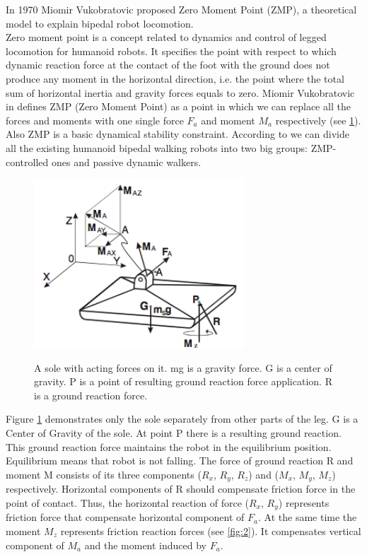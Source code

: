 \documentclass[12pt,a4paper]{report}
\begin{document}
		In 1970 Miomir Vukobratovic proposed Zero Moment Point (ZMP), a theoretical model to explain bipedal robot locomotion.\\
		Zero moment point is a concept related to dynamics and control of legged locomotion for humanoid robots. It specifies the point with respect to which dynamic reaction force at the contact of the foot with the ground does not produce any moment in the horizontal direction, i.e. the point where the total sum of horizontal inertia and gravity forces equals to zero.
		Miomir Vukobratovic in \cite{vukobratovic2004zero} defines ZMP (Zero Moment Point) as a point in which we can replace all the forces and moments with one single force $F_a$ and moment $M_a$ respectively  (see \cref{fig:1}). Also ZMP is a basic dynamical stability constraint.	According to \cite{manchester2011stable} we can divide all the existing humanoid bipedal walking robots into two big groups: ZMP-controlled ones and passive dynamic walkers.
	
		\begin{figure}[h!]
			\vspace{-0.2cm}
			\centering
			{\includegraphics[width=0.7\textwidth]{1}}
			\caption{A sole with acting forces on it. mg is a gravity force. G is a center of gravity. P is a point of resulting ground reaction force application. R is a ground reaction force.}
			\label{fig:1}
			\vspace{-0.1cm}
		\end{figure}

		Figure \ref{fig:1} demonstrates only the sole separately from other parts of the leg. G is a Center of Gravity of the sole. At point P there is a resulting ground reaction. This ground reaction force maintains the robot in the equilibrium position. Equilibrium means that robot is not falling. The force of ground reaction R and moment M consists of its three components ($R_x$, $R_y$, $R_z$) and ($M_x$, $M_y$, $M_z$) respectively. Horizontal components of R should compensate friction force in the point of contact. Thus, the horizontal reaction of force ($R_x$, $R_y$) represents 
		friction force that compensate horizontal component of $F_a$. At the same time the moment $M_z$ represents friction reaction forces (see \cref{fig:2}).  It compensates vertical component of $M_a$ and the moment induced by $F_a$. \cite{vukobratovic2004zero}
\end{document}
